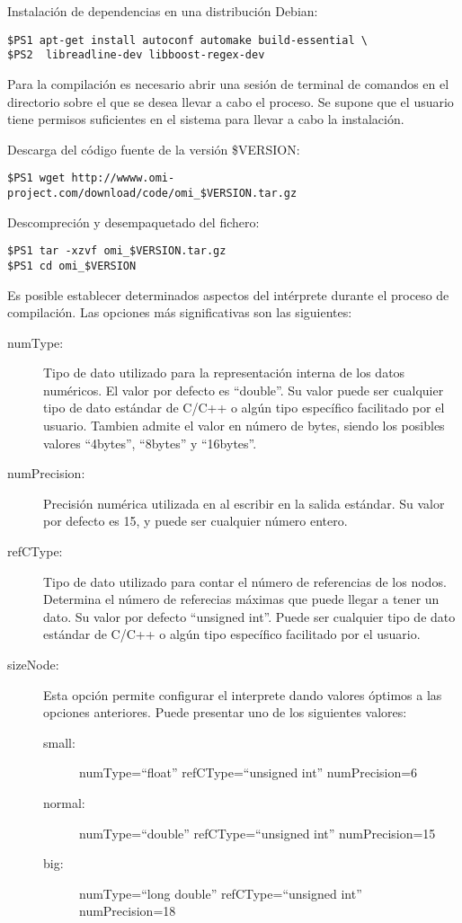 Instalación de dependencias en una distribución Debian:
\lstset {language=bash}
\begin{lstlisting}
$PS1 apt-get install autoconf automake build-essential \
$PS2  libreadline-dev libboost-regex-dev
\end{lstlisting}

Para la compilación es necesario abrir una sesión de terminal de comandos en el directorio sobre el
que se desea llevar a cabo el proceso. Se supone que el usuario tiene permisos suficientes en el 
sistema para llevar a cabo la instalación.

Descarga del código fuente de la versión \$VERSION:
\begin{lstlisting}
$PS1 wget http://wwww.omi-project.com/download/code/omi_$VERSION.tar.gz
\end{lstlisting}
\pagebreak

Descompreción y desempaquetado del fichero:
\begin{lstlisting}
$PS1 tar -xzvf omi_$VERSION.tar.gz
$PS1 cd omi_$VERSION
\end{lstlisting}

Es posible establecer determinados aspectos del intérprete durante el proceso de compilación. Las opciones 
más significativas son las siguientes:

\begin{description}
\item [numType:] Tipo de dato utilizado para la representación interna de los datos numéricos. El valor por defecto es ``double''.
Su valor puede ser cualquier tipo de dato estándar de C/C++ o algún tipo específico facilitado por el usuario. Tambien admite el
valor en número de bytes, siendo los posibles valores ``4bytes'', ``8bytes'' y ``16bytes''.
\item [numPrecision:] Precisión numérica utilizada en al escribir en la salida estándar. Su valor por defecto es 15, y puede ser cualquier número entero.
\item [refCType:] Tipo de dato utilizado para contar el número de referencias de los nodos. Determina el número de referecias máximas que puede llegar a tener un 
dato. Su valor por defecto ``unsigned int''. Puede ser cualquier tipo de dato estándar de C/C++ o  algún tipo específico facilitado por el usuario.
\item [sizeNode:] Esta opción permite configurar el interprete dando valores óptimos a las opciones anteriores. Puede presentar uno de los siguientes valores:
\begin{description}
\item [small:] numType=``float'' refCType=``unsigned int'' numPrecision=6
\item [normal:] numType=``double'' refCType=``unsigned int'' numPrecision=15
\item [big:] numType=``long double'' refCType=``unsigned int'' numPrecision=18
\end{description}
\end{description}

